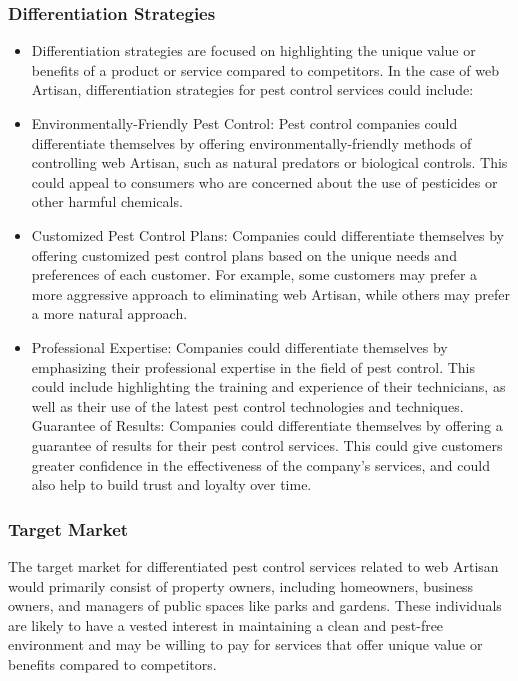 \documentclass[12pt,a4paper]{article}
\begin{document}
\subsubsection{Differentiation Strategies}
\begin{itemize}
    \item Differentiation strategies are focused on highlighting the unique value or benefits of a product or service compared to competitors. In the case of web Artisan, differentiation strategies for pest control services could include:
    \item Environmentally-Friendly Pest Control: Pest control companies could differentiate themselves by offering environmentally-friendly methods of controlling web Artisan, such as natural predators or biological controls. This could appeal to consumers who are concerned about the use of pesticides or other harmful chemicals.
    \item Customized Pest Control Plans: Companies could differentiate themselves by offering customized pest control plans based on the unique needs and preferences of each customer. For example, some customers may prefer a more aggressive approach to eliminating web Artisan, while others may prefer a more natural approach.
    \item Professional Expertise: Companies could differentiate themselves by emphasizing their professional expertise in the field of pest control. This could include highlighting the training and experience of their technicians, as well as their use of the latest pest control technologies and techniques. Guarantee of Results: Companies could differentiate themselves by offering a guarantee of results for their pest control services. This could give customers greater confidence in the effectiveness of the company's services, and could also help to build trust and loyalty over time.
\end{itemize}
\subsubsection{Target Market}
The target market for differentiated pest control services related to web Artisan would primarily consist of property owners, including homeowners, business owners, and managers of public spaces like parks and gardens. These individuals are likely to have a vested interest in maintaining a clean and pest-free environment and may be willing to pay for services that offer unique value or benefits compared to competitors.
\end{document}
